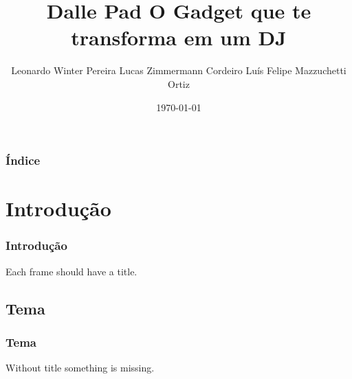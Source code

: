 \documentclass{beamer}
\begin{document}
\title{Dalle Pad \newline O Gadget que te transforma em um DJ}
\author{Leonardo Winter Pereira \newline Lucas Zimmermann Cordeiro \newline Luís Felipe Mazzuchetti Ortiz}
\date{\today}

\begin{frame}
\titlepage
\end{frame}

\begin{frame}\frametitle{Índice}\tableofcontents
\end{frame}

    \section{Introdução}

    \begin{frame}\frametitle{Introdução}
    Each frame should have a title.
    \end{frame}

        \subsection{Tema}

        \begin{frame}\frametitle{Tema}
        Without title something is missing.
        \end{frame}
\end{document}
